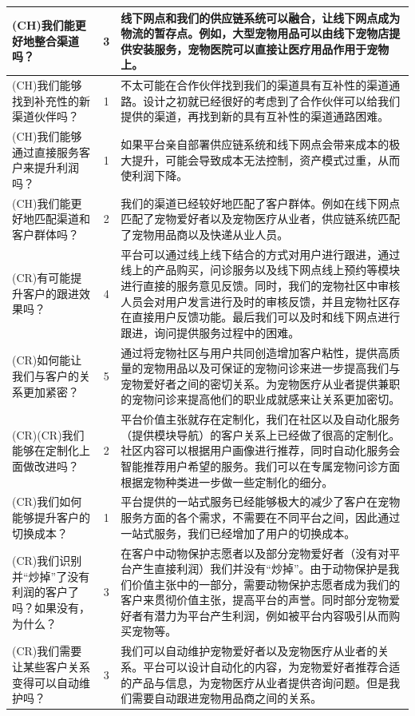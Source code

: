\documentclass[a4paper]{ctexart}
\begin{document}
\begin{table}[h]
  \centering
\begin{tabular}{|p{3.5cm}|c|p{10cm}|}
  \hline
  (CH)我们能更好地整合渠道吗？ & 3 & 线下网点和我们的供应链系统可以融合，让线下网点成为物流的暂存点。例如，大型宠物用品可以由线下宠物店提供安装服务，宠物医院可以直接让医疗用品作用于宠物上。\\
  \hline
  (CH)我们能够找到补充性的新渠道伙伴吗？ & 1 & 不太可能在合作伙伴找到我们的渠道具有互补性的渠道通路。设计之初就已经很好的考虑到了合作伙伴可以给我们提供的渠道，再找到新的具有互补性的渠道通路困难。\\
  \hline
  (CH)我们能够通过直接服务客户来提升利润吗？ & 1 & 如果平台亲自部署供应链系统和线下网点会带来成本的极大提升，可能会导致成本无法控制，资产模式过重，从而使利润下降。\\
  \hline
  (CH)我们能更好地匹配渠道和客户群体吗？ & 2 & 我们的渠道已经较好地匹配了客户群体。例如在线下网点匹配了宠物爱好者以及宠物医疗从业者，供应链系统匹配了宠物用品商以及快递从业人员。\\
  \hline
  (CR)有可能提升客户的跟进效果吗？ & 4 & 平台可以通过线上线下结合的方式对用户进行跟进，通过线上的产品购买，问诊服务以及线下网点线上预约等模块进行直接的服务意见反馈。同时，我们的宠物社区中审核人员会对用户发言进行及时的审核反馈，并且宠物社区存在直接用户反馈功能。最后我们可以及时和线下网点进行跟进，询问提供服务过程中的困难。\\
  \hline
  (CR)如何能让我们与客户的关系更加紧密？ & 5 & 通过将宠物社区与用户共同创造增加客户粘性，提供高质量的宠物用品以及可保证的宠物问诊来进一步提高我们与宠物爱好者之间的密切关系。为宠物医疗从业者提供兼职的宠物问诊来提高他们的职业成就感来让关系更加密切。\\
  \hline
  (CR)(CR)我们能够在定制化上面做改进吗？ & 2 & 平台价值主张就存在定制化，我们在社区以及自动化服务（提供模块导航）的客户关系上已经做了很高的定制化。社区内容可以根据用户画像进行推荐，同时自动化服务会智能推荐用户希望的服务。我们可以在专属宠物问诊方面根据宠物种类进一步做一些定制化的细分。\\
  \hline
  (CR)我们如何能够提升客户的切换成本？ & 1 & 平台提供的一站式服务已经能够极大的减少了客户在宠物服务方面的各个需求，不需要在不同平台之间，因此通过一站式服务，我们已经增加了用户的切换成本。\\
  \hline
  (CR)我们识别并“炒掉”了没有利润的客户了吗？如果没有，为什么？ & 3 & 在客户中动物保护志愿者以及部分宠物爱好者（没有对平台产生直接利润）我们并没有“炒掉”。由于动物保护是我们价值主张中的一部分，需要动物保护志愿者成为我们的客户来贯彻价值主张，提高平台的声誉。同时部分宠物爱好者有潜力为平台产生利润，例如被平台内容吸引从而购买宠物等。\\
  \hline
  (CR)我们需要让某些客户关系变得可以自动维护吗？ & 3 & 我们可以自动维护宠物爱好者以及宠物医疗从业者的关系。平台可以设计自动化的内容，为宠物爱好者推荐合适的产品与信息，为宠物医疗从业者提供咨询问题。但是我们需要自动跟进宠物用品商之间的关系。\\
  \hline
\end{tabular}
\end{table}
\end{document}
